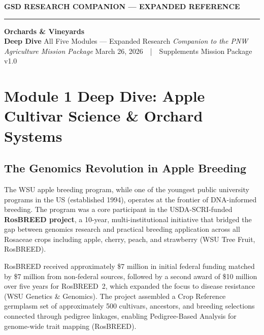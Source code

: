 \documentclass[11pt,letterpaper]{article}
\begin{document}
\thispagestyle{empty}
\begin{center}
\vspace*{3cm}
{\small\sffamily\textcolor{primary}{\textbf{GSD RESEARCH COMPANION --- EXPANDED REFERENCE}}}
\vspace{0.3cm}
\textcolor{bordergray}{\rule{8cm}{0.4pt}}
\vspace{1.5cm}
{\fontsize{26}{32}\selectfont\bfseries\sffamily\textcolor{primary}{Orchards \& Vineyards\\[0.3em]Deep Dive}}
\vspace{0.8cm}
{\Large\sffamily\textcolor{secondary}{All Five Modules --- Expanded Research}}
\vspace{0.5cm}
{\large\sffamily\itshape\textcolor{tertiary}{Companion to the PNW Agriculture Mission Package}}
\vspace{4cm}
{\small\sffamily\textcolor{subtlegray}{March 26, 2026~~|~~Supplements Mission Package v1.0}}
\end{center}
\newpage

\tableofcontents
\newpage

\section{Module 1 Deep Dive: Apple Cultivar Science \& Orchard Systems}

\subsection{The Genomics Revolution in Apple Breeding}

The WSU apple breeding program, while one of the youngest public university programs in the US (established 1994), operates at the frontier of DNA-informed breeding. The program was a core participant in the USDA-SCRI-funded \textbf{RosBREED project}, a 10-year, multi-institutional initiative that bridged the gap between genomics research and practical breeding application across all Rosaceae crops including apple, cherry, peach, and strawberry (WSU Tree Fruit, RosBREED).

RosBREED received approximately \$7 million in initial federal funding matched by \$7 million from non-federal sources, followed by a second award of \$10 million over five years for RosBREED~2, which expanded the focus to disease resistance (WSU Genetics \& Genomics). The project assembled a Crop Reference germplasm set of approximately 500 cultivars, ancestors, and breeding selections connected through pedigree linkages, enabling Pedigree-Based Analysis for genome-wide trait mapping (RosBREED).
\end{document}
